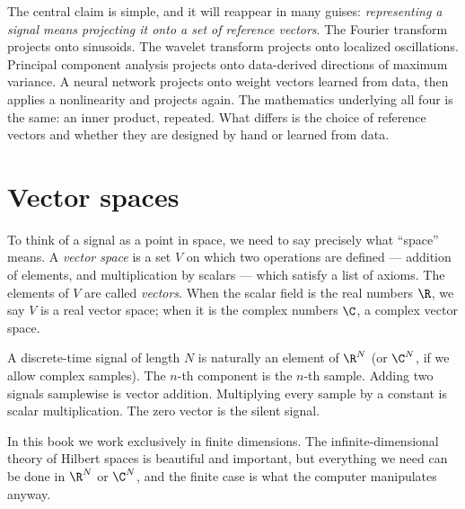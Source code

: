 The central claim is simple, and it will reappear in many guises:
\emph{representing a signal means projecting it onto a set of reference
vectors}.  The Fourier transform projects onto sinusoids.  The wavelet
transform projects onto localized oscillations.  Principal component
analysis projects onto data-derived directions of maximum variance.  A
neural network projects onto weight vectors learned from data, then
applies a nonlinearity and projects again.  The mathematics underlying
all four is the same: an inner product, repeated.  What differs is the
choice of reference vectors and whether they are designed by hand or
learned from data.


\section{Vector spaces}

To think of a signal as a point in space, we need to say precisely what
``space'' means.  A \emph{vector space} is a set $V$ on which two
operations are defined --- addition of elements, and multiplication by
scalars --- which satisfy a list of axioms.
The elements of $V$ are called \emph{vectors}.  When the scalar field is
the real numbers $\R$, we say $V$ is a real vector space; when it is the
complex numbers $\C$, a complex vector space.

A discrete-time signal of length $N$ is naturally an element of $\R^N$
(or $\C^N$, if we allow complex samples).  The $n$-th component is the
$n$-th sample.  Adding two signals samplewise is vector addition.
Multiplying every sample by a constant is scalar multiplication.  The
zero vector is the silent signal.

In this book we work exclusively in finite dimensions.  The infinite-dim\-en\-sion\-al
theory of Hilbert spaces is beautiful and important, but everything we
need can be done in $\R^N$ or $\C^N$, and the finite case is what the
computer manipulates anyway.

